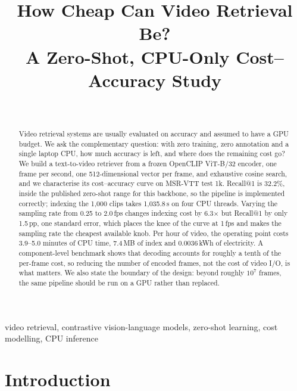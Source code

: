 \documentclass[journal]{IEEEtran}
\begin{document}
\title{How Cheap Can Video Retrieval Be?\\A Zero-Shot, CPU-Only Cost--Accuracy Study}

\author{\\[2pt]
}

\maketitle

\begin{abstract}
Video retrieval systems are usually evaluated on accuracy and assumed to have a GPU
budget. We ask the complementary question: with zero training, zero annotation and a
single laptop CPU, how much accuracy is left, and where does the remaining cost go? We
build a text-to-video retriever from a frozen OpenCLIP ViT-B/32 encoder, one frame per
second, one 512-dimensional vector per frame, and exhaustive cosine search, and we
characterise its cost--accuracy curve on MSR-VTT test 1k. Recall@1 is 32.2\%, inside the
published zero-shot range for this backbone, so the pipeline is implemented correctly;
indexing the 1,000 clips takes 1{,}035.8\,s on four CPU threads. Varying the sampling rate
from 0.25 to 2.0\,fps changes indexing cost by 6.3$\times$ but Recall@1 by only
1.5\,pp, one standard error, which places the knee of the curve at 1\,fps and makes the
sampling rate the cheapest available knob. Per hour of video, the operating point costs
3.9--5.0 minutes of CPU time, 7.4\,MB of index and 0.0036\,kWh of electricity. A
component-level benchmark shows that decoding accounts for roughly a tenth of the
per-frame cost, so reducing the number of encoded frames, not the cost of video I/O, is
what matters. We also state the boundary of the design: beyond roughly $10^{7}$ frames,
the same pipeline should be run on a GPU rather than replaced.
\end{abstract}

\begin{IEEEkeywords}
video retrieval, contrastive vision-language models, zero-shot learning, cost modelling,
CPU inference
\end{IEEEkeywords}

\section{Introduction}
\end{document}
